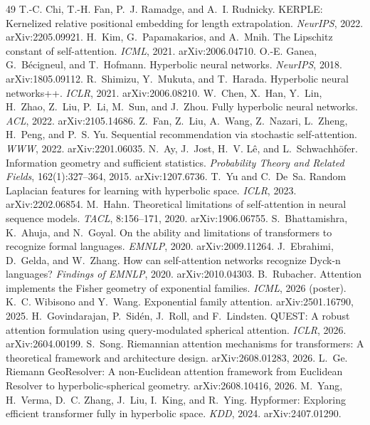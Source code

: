 \documentclass[11pt]{article}
\begin{document}
\begin{thebibliography}{49}
 T.-C. Chi, T.-H. Fan, P.~J. Ramadge, and A.~I. Rudnicky. KERPLE: Kernelized relative positional embedding for length extrapolation. \emph{NeurIPS}, 2022. arXiv:2205.09921.
 H.~Kim, G.~Papamakarios, and A.~Mnih. The Lipschitz constant of self-attention. \emph{ICML}, 2021. arXiv:2006.04710.
 O.-E. Ganea, G.~B\'ecigneul, and T.~Hofmann. Hyperbolic neural networks. \emph{NeurIPS}, 2018. arXiv:1805.09112.
 R.~Shimizu, Y.~Mukuta, and T.~Harada. Hyperbolic neural networks++. \emph{ICLR}, 2021. arXiv:2006.08210.
 W.~Chen, X.~Han, Y.~Lin, H.~Zhao, Z.~Liu, P.~Li, M.~Sun, and J.~Zhou. Fully hyperbolic neural networks. \emph{ACL}, 2022. arXiv:2105.14686.
 Z.~Fan, Z.~Liu, A.~Wang, Z.~Nazari, L.~Zheng, H.~Peng, and P.~S. Yu. Sequential recommendation via stochastic self-attention. \emph{WWW}, 2022. arXiv:2201.06035.
 N.~Ay, J.~Jost, H.~V. L\^e, and L.~Schwachh\"ofer. Information geometry and sufficient statistics. \emph{Probability Theory and Related Fields}, 162(1):327--364, 2015. arXiv:1207.6736.
 T.~Yu and C.~De~Sa. Random Laplacian features for learning with hyperbolic space. \emph{ICLR}, 2023. arXiv:2202.06854.
 M.~Hahn. Theoretical limitations of self-attention in neural sequence models. \emph{TACL}, 8:156--171, 2020. arXiv:1906.06755.
 S.~Bhattamishra, K.~Ahuja, and N.~Goyal. On the ability and limitations of transformers to recognize formal languages. \emph{EMNLP}, 2020. arXiv:2009.11264.
 J.~Ebrahimi, D.~Gelda, and W.~Zhang. How can self-attention networks recognize Dyck-n languages? \emph{Findings of EMNLP}, 2020. arXiv:2010.04303.
 B.~Rubacher. Attention implements the Fisher geometry of exponential families. \emph{ICML}, 2026 (poster).
 K.~C. Wibisono and Y.~Wang. Exponential family attention. arXiv:2501.16790, 2025.
 H.~Govindarajan, P.~Sid\'en, J.~Roll, and F.~Lindsten. QUEST: A robust attention formulation using query-modulated spherical attention. \emph{ICLR}, 2026. arXiv:2604.00199.
 S.~Song. Riemannian attention mechanisms for transformers: A theoretical framework and architecture design. arXiv:2608.01283, 2026.
 L.~Ge. Riemann GeoResolver: A non-Euclidean attention framework from Euclidean Resolver to hyperbolic-spherical geometry. arXiv:2608.10416, 2026.
 M.~Yang, H.~Verma, D.~C. Zhang, J.~Liu, I.~King, and R.~Ying. Hypformer: Exploring efficient transformer fully in hyperbolic space. \emph{KDD}, 2024. arXiv:2407.01290.
\end{thebibliography}
\end{document}
